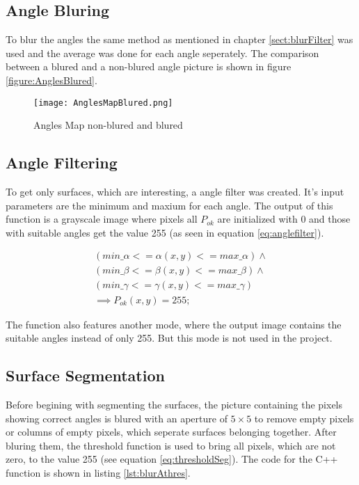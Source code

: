\subsection{Angle Bluring}

To blur the angles the same method as mentioned in chapter \vref{sect:blurFilter} was used and
the average was done for each angle seperately. The comparison between a blured and a non-blured
angle picture is shown in figure \vref{figure:AnglesBlured}.

\begin{figure}[H]
\begin{center}
  \texttt{[image: AnglesMapBlured.png]}
  \caption{Angles Map non-blured and blured}
  \label{figure:AnglesBlured}
\end{center}
\end{figure}


\subsection{Angle Filtering}

To get only surfaces, which are interesting, a angle filter was created. It's input parameters
are the minimum and maxium for each angle. The output of this function is a grayscale image
where pixels all $P_{ok}$ are initialized with 0 and those with suitable angles get the value 255
(as seen in equation \vref{eq:anglefilter}).

\begin{gather}
(min\_\alpha  <= \alpha(x,y) <=max\_\alpha ) \wedge \nonumber\\ 
(min\_\beta  <= \beta(x,y) <=max\_\beta )\wedge\nonumber\\
(min\_\gamma  <= \gamma(x,y) <=max\_\gamma )\nonumber\\
\implies P_{ok}(x,y) = 255;
\label{eq:anglefilter}
\end{gather}

The function also features another mode, where the output image contains the suitable angles instead of only 255.
But this mode is not used in the project. 

\subsection{Surface Segmentation}

Before begining with segmenting the surfaces, the picture containing the pixels showing 
correct angles is blured with an aperture of $5 \times 5$ to remove empty pixels or columns of empty pixels, 
which seperate surfaces belonging together. After bluring them, the threshold function is used to bring 
all pixels, which are not zero, to the value 255 (see equation \vref{eq:thresholdSeg}).
The code for the C++ function is shown in listing \vref{lst:blurAthres}.

